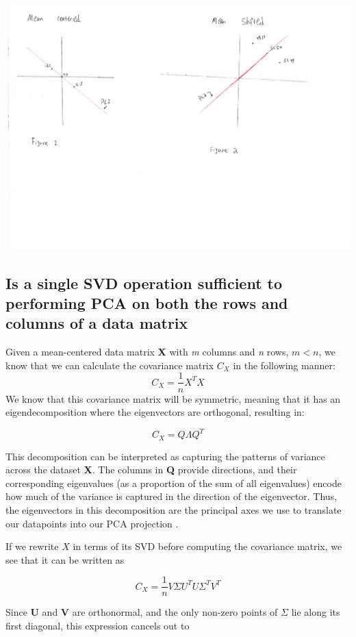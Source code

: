 \documentclass[11pt,a4paper,landscape]{article}
\begin{document}
\includegraphics[width=\textwidth]{figure1_2.pdf}

\subsection{Is a single SVD operation sufficient to performing PCA on both the rows and columns of a data matrix}

Given a mean-centered data matrix \textbf{X} with \textit{m} columns and \textit{n} rows, $m < n$, we know that we can calculate the covariance matrix \textbf{$C_{X}$} in the following manner:
$$ C_{X} = \frac{1}{n} X^{T}X$$
We know that this covariance matrix will be symmetric, meaning that it has an eigendecomposition where the eigenvectors are orthogonal, resulting in:

$$ C_{X} = Q \Lambda Q^{T} $$

This decomposition can be interpreted as capturing the patterns of variance across the dataset \textbf{X}. The columns in \textbf{Q} provide directions, and their corresponding eigenvalues (as a proportion of the sum of all eigenvalues) encode how much of the variance is captured in the direction of the eigenvector. Thus, the eigenvectors in this decomposition are the principal axes we use to translate our datapoints into our PCA projection \cite{pca_from_cxx} .\newline

If we rewrite $X$ in terms of its SVD  before computing the covariance matrix, we see that it can be written as

$$ C_{X} = \frac{1}{n} V \Sigma U^{T} U\Sigma^{T} V^{T}  $$

Since \textbf{U} and \textbf{V} are orthonormal, and the only non-zero points of $ \Sigma $ lie along its first diagonal, this expression cancels out to                                                                                                                                                                          
\end{document}
